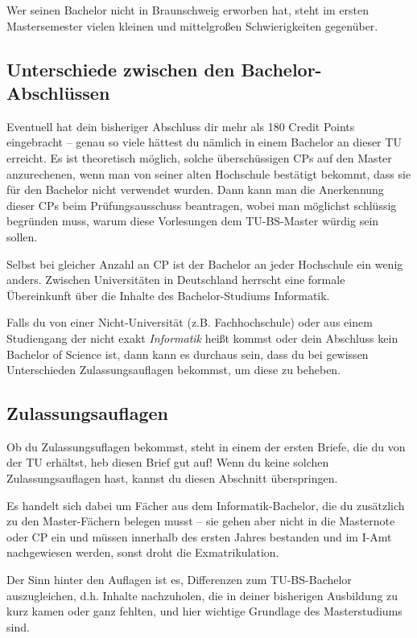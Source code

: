 \begin{multicols}{2}
	Wer seinen Bachelor nicht in Braunschweig erworben hat, steht im ersten Mastersemester vielen kleinen und mittelgroßen Schwierigkeiten gegenüber.

	\subsection{Unterschiede zwischen den Bachelor-Abschlüssen}
		Eventuell hat dein bisheriger Abschluss dir mehr als 180 Credit Points eingebracht -- genau so viele hättest du nämlich in einem Bachelor an dieser TU erreicht. Es ist theoretisch möglich, solche überschüssigen CPs auf den Master anzurechenen, wenn man von seiner alten Hochschule bestätigt bekommt, dass sie für den Bachelor nicht verwendet wurden. Dann kann man die Anerkennung dieser CPs beim Prüfungsausschuss beantragen, wobei man möglichst schlüssig begründen muss, warum diese Vorlesungen dem TU-BS-Master würdig sein sollen.

		Selbst bei gleicher Anzahl an CP ist der Bachelor an jeder Hochschule ein wenig anders. Zwischen Universitäten in Deutschland herrscht eine formale Übereinkunft über die Inhalte des Bachelor-Studiums Informatik. 

		Falls du von einer Nicht-Universität (z.B. Fachhochschule) oder aus einem Studiengang der nicht exakt \emph{Informatik} heißt kommst oder dein Abschluss kein Bachelor of Science ist, dann kann es durchaus sein, dass du bei gewissen Unterschieden Zulassungsauflagen bekommst, um diese zu beheben.

	\subsection{Zulassungsauflagen}
	\label{auflagen}
	Ob du Zulassungsuflagen bekommst, steht in einem der ersten Briefe, die du von der TU erhältst, heb diesen Brief gut auf! Wenn du keine solchen Zulassungsauflagen hast, kannst du diesen Abschnitt überspringen.

	Es handelt sich dabei um Fächer aus dem Informatik-Bachelor, die du zusätzlich zu den Master-Fächern belegen musst -- sie gehen aber nicht in die Masternote oder CP ein und müssen innerhalb des ersten Jahres bestanden und im I-Amt nachgewiesen werden, sonst droht die Exmatrikulation.

	Der Sinn hinter den Auflagen ist es, Differenzen zum TU-BS-Bachelor auszugleichen, d.h. Inhalte nachzuholen, die in deiner bisherigen Ausbildung zu kurz kamen oder ganz fehlten, und hier wichtige Grundlage des Masterstudiums sind.


\end{multicols}
